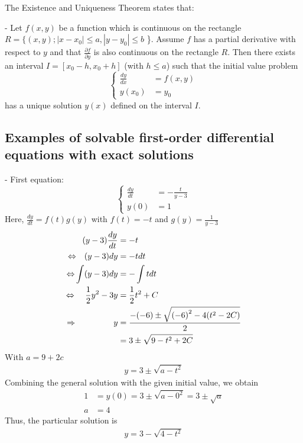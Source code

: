 \documentclass[a4paper]{article}
\begin{document}
The Existence and Uniqueness Theorem states that:

- Let \(f(x,y)\) be a function which is continuous on the rectangle  \(R = \{(x, y); |x - x_0| \leq a, |y - y_0| \leq b\) \}.
Assume \(f\) has a partial derivative with respect to \(y\) and that \(\frac{\partial f}{\partial y}\) is also continuous on the rectangle \(R\).
Then there exists an interval \(I=[x_0-h, x_0+h]\) (with \(h \leq a\)) such that the initial value problem
\begin{equation*}
  \begin{cases}
    \frac{dy}{dx} & = f(x,y) \\
    y(x_0)        & = y_0
  \end{cases}
\end{equation*}
has a unique solution \(y(x)\) defined on the interval \(I\).

\subsection{Examples of solvable first-order differential equations with exact solutions}
- First equation:
\begin{equation*}
  \begin{cases}
    \frac{dy}{dt} & = - \frac{t}{y - 3} \\
    y(0)          & = 1
  \end{cases}
\end{equation*}
Here, \(\frac{dy}{dt} = f(t)g(y)\) with \(f(t) = -t\) and \(g(y) = \frac{1}{y-3}\)
\begin{align*}
  (y - 3) \frac{dy}{dt}                                     & = -t                                                \\
  {\color{black}\Leftrightarrow} ~~~ (y - 3) dy             & = -t dt                                             \\
  {\color{black}\Leftrightarrow}  \int (y - 3) dy           & = -\int tdt                                         \\
  {\color{black}\Leftrightarrow} ~~~~ \frac {1}{2} y^2 - 3y & = \frac{1}{2} t^2 + C                               \\
  {\color{black}\Rightarrow} ~~~~~~~~~~~~~~ y               & = \frac{-(-6) \pm \sqrt{{(-6)}^2 - 4(t^2 - 2C)}}{2} \\
                                                            & = 3 \pm \sqrt{9 - t^2 + 2C}
\end{align*}
With \(a = 9 + 2c\)
\begin{align*}
  y = 3 \pm \sqrt{a - t^2}
\end{align*}
Combining the general solution with the given initial value, we obtain
\begin{align*}
  1 & = y(0) = 3 \pm \sqrt{a - 0^2} = 3 \pm \sqrt{a} \\
  a & = 4
\end{align*}
Thus, the particular solution is
\begin{align*}
  y = 3 - \sqrt{4-t^2}
\end{align*}
\end{document}
